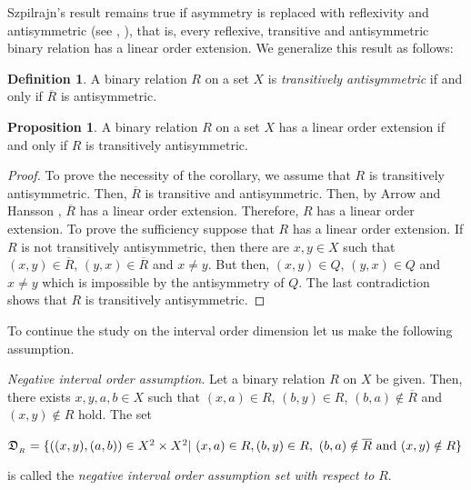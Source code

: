 \documentclass{article}
\theoremstyle{definition}
\newtheorem{definition}{Definition}[section]
\newtheorem{proposition}[theorem]{Proposition}
\begin{document}
Szpilrajn's result remains true if asymmetry is replaced with reflexivity and antisymmetric (see \cite[Page 64]{arr}, \cite{han}),
that is, every reflexive, transitive and antisymmetric binary relation has a linear order extension.
We generalize this result as follows:




\begin{definition}{\rm A binary relation $R$ on a set $X$ is {\it transitively antisymmetric}
if and only if $\overline{R}$ is antisymmetric.}
\end{definition}








\begin{proposition}\label{876}{\rm A binary relation $R$ on a set $X$ has a linear order extension 
if and only if
$R$ is transitively antisymmetric.}
\end{proposition}
\begin{proof} To prove the necessity of the corollary, we assume that $R$ is transitively antisymmetric.
Then, $\overline{R}$ is transitive and antisymmetric. Then, by Arrow \cite[Page 64]{arr} and Hansson \cite{han}, 
$\overline{R}$ has a linear order extension. Therefore, $R$ has a linear order extension.
To prove the sufficiency suppose that $R$ has a linear order extension.
If $R$ is not transitively antisymmetric, then there are $x, y\in X$ such that
$(x,y)\in \overline{R}$, $(y,x)\in \overline{R}$ and $x\neq y$. But then,
$(x,y)\in Q$, $(y,x)\in Q$ and $x\neq y$ which
is impossible by the antisymmetry of $Q$. The last contradiction shows that $R$ is transitively antisymmetric.
\end{proof}











\par
To continue the study on the interval order dimension
let us make the following assumption.
\par\noindent
{\it Negative interval order assumption}. 
Let a binary relation $R$ on $X$ be given. Then, there exists
$x,y, a, b\in X$ such that
$(x,a)\in R$, $(b,y)\in R$, $(b,a)\notin \overline{R}$ and $(x,y)\notin R$ hold.
The set 
\begin{center}
$\mathfrak{D}_{_R}=\{((x,y),(a,b))\in X^2\times X^2\vert \ 
(x,a)\in R, (b,y)\in R,\ (b,a)\notin \overline{R} \ {\rm and}\  (x,y)\notin R\}$
\end{center}
is called the {\it negative interval order assumption set with respect to} $R$.
\end{document}
